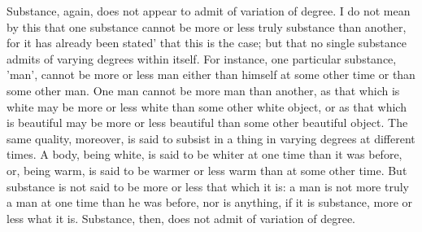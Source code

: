 Substance, again, does not appear to admit of variation of degree. I do
not mean by this that one substance cannot be more or less truly
substance than another, for it has already been stated' that this is
the case; but that no single substance admits of varying degrees within
itself. For instance, one particular substance, 'man', cannot be more
or less man either than himself at some other time or than some other
man. One man cannot be more man than another, as that which is white
may be more or less white than some other white object, or as that
which is beautiful may be more or less beautiful than some other
beautiful object. The same quality, moreover, is said to subsist in a
thing in varying degrees at different times. A body, being white, is
said to be whiter at one time than it was before, or, being warm, is
said to be warmer or less warm than at some other time. But substance
is not said to be more or less that which it is: a man is not more
truly a man at one time than he was before, nor is anything, if it is
substance, more or less what it is. Substance, then, does not admit of
variation of degree.

